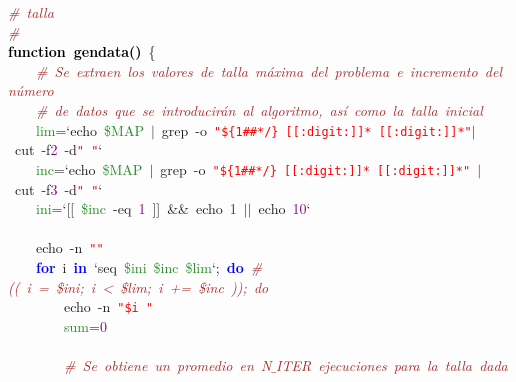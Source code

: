 \mbox{}\textit{\textcolor{Brown}{\#\ talla}} \\
\mbox{}\textit{\textcolor{Brown}{\#}} \\
\mbox{}\textbf{\textcolor{Black}{function\ gendata()}}\ \{ \\
\mbox{}\ \ \ \ \textit{\textcolor{Brown}{\#\ Se\ extraen\ los\ valores\ de\ talla\ máxima\ del\ problema\ e\ incremento\ del\ número}} \\
\mbox{}\ \ \ \ \textit{\textcolor{Brown}{\#\ de\ datos\ que\ se\ introducirán\ al\ algoritmo,\ así\ como\ la\ talla\ inicial}} \\
\mbox{}\ \ \ \ \textcolor{ForestGreen}{lim}\textcolor{BrickRed}{=}`echo\ \textcolor{ForestGreen}{\$MAP}\ \textcolor{BrickRed}{$|$}\ grep\ -o\ \texttt{\textcolor{Red}{"{}\$\{1\#\#*/\}\ [[:digit:]]*\ [[:digit:]]*"{}}}\textcolor{BrickRed}{$|$}\ cut\ -f\textcolor{Purple}{2}\ -d\texttt{\textcolor{Red}{"{}\ "{}}}` \\
\mbox{}\ \ \ \ \textcolor{ForestGreen}{inc}\textcolor{BrickRed}{=}`echo\ \textcolor{ForestGreen}{\$MAP}\ \textcolor{BrickRed}{$|$}\ grep\ -o\ \texttt{\textcolor{Red}{"{}\$\{1\#\#*/\}\ [[:digit:]]*\ [[:digit:]]*"{}}}\ \textcolor{BrickRed}{$|$}\ cut\ -f\textcolor{Purple}{3}\ -d\texttt{\textcolor{Red}{"{}\ "{}}}` \\
\mbox{}\ \ \ \ \textcolor{ForestGreen}{ini}\textcolor{BrickRed}{=}`\textcolor{BrickRed}{[[}\ \textcolor{ForestGreen}{\$inc}\ -eq\ \textcolor{Purple}{1}\ \textcolor{BrickRed}{]]}\ \textcolor{BrickRed}{\&\&}\ echo\ \textcolor{Purple}{1}\ \textcolor{BrickRed}{$|$$|$}\ echo\ \textcolor{Purple}{10}` \\
\mbox{}\ \ \ \  \\
\mbox{}\ \ \ \ echo\ -n\ \texttt{\textcolor{Red}{"{}"{}}} \\
\mbox{}\ \ \ \ \textbf{\textcolor{Blue}{for}}\ i\ \textbf{\textcolor{Blue}{in}}\ `seq\ \textcolor{ForestGreen}{\$ini}\ \textcolor{ForestGreen}{\$inc}\ \textcolor{ForestGreen}{\$lim}`\textcolor{BrickRed}{;}\ \textbf{\textcolor{Blue}{do}}\ \textit{\textcolor{Brown}{\#((\ i\ =\ \$ini;\ i\ \textless{}\ \$lim;\ i\ +=\ \$inc\ ));\ do}} \\
\mbox{}\ \ \ \ \ \ \ \ echo\ -n\ \texttt{\textcolor{Red}{"{}\$i\ "{}}} \\
\mbox{}\ \ \ \ \ \ \ \ \textcolor{ForestGreen}{sum}\textcolor{BrickRed}{=}\textcolor{Purple}{0} \\
\mbox{}\ \ \ \ \ \ \ \  \\
\mbox{}\ \ \ \ \ \ \ \ \textit{\textcolor{Brown}{\#\ Se\ obtiene\ un\ promedio\ en\ N$\_$ITER\ ejecuciones\ para\ la\ talla\ dada}} \\

